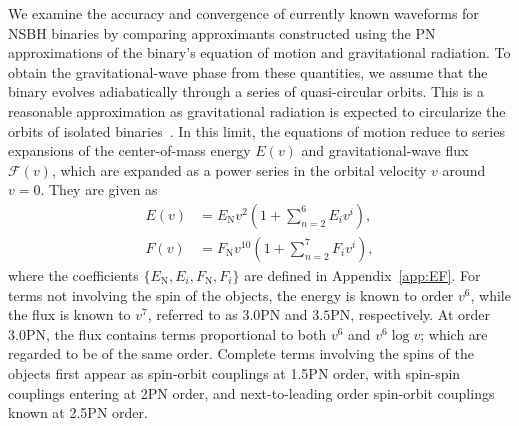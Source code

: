 We examine the accuracy and convergence of currently known waveforms for
\ac{NSBH} binaries by comparing approximants constructed
using the \ac{PN} approximations of the binary's equation of motion and
gravitational radiation.  To obtain the gravitational-wave phase from these
quantities, we assume that the binary evolves adiabatically through a series
of quasi-circular orbits. This is a reasonable approximation as gravitational
radiation is expected to circularize the orbits of isolated
binaries~\cite{Peters:1964zz}.  In this limit, the equations of motion reduce
to series expansions of the center-of-mass energy $E(v)$ and gravitational-wave
flux $\mathcal{F}(v)$, which are expanded as a power series in the orbital
velocity $v$ around $v = 0$. They are given as
%
\begin{align}
%
E(v) &= E_{\mathrm{N}} v^2 \left(1+\sum_{n=2}^{6}E_i v^i\right), \\
%
F(v) &= F_{\mathrm{N}} v^{10} \left(1+\sum_{n=2}^{7}F_i v^i\right),
%
\end{align}
%
where the coefficients $\{E_\mathrm{N}, E_i, F_\mathrm{N}, F_i\}$ are
defined in Appendix~\ref{app:EF}.  For terms not involving the spin of the
objects, the energy is known to order $v^6$, while the flux is known to $v^7$,
referred to as $3.0$PN and $3.5$PN, respectively.  At order $3.0$PN, the flux
contains terms proportional to both $v^6$ and $v^6 \log v$; which are regarded
to be of the same order. Complete terms involving the spins of the objects first
appear as spin-orbit couplings at 1.5\ac{PN} order, with spin-spin couplings
entering at 2\ac{PN} order, and next-to-leading order spin-orbit couplings
known at 2.5\ac{PN} order. 

